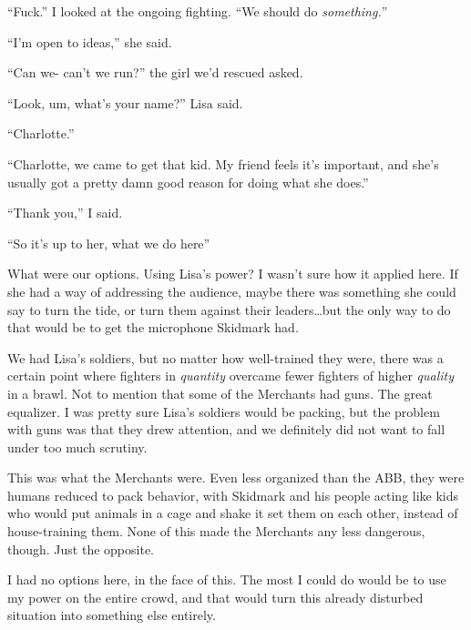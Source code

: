 ``Fuck.'' I looked at the ongoing fighting.  ``We should do \emph{something.}''



``I'm open to ideas,'' she said.



``Can we- can't we run?'' the girl we'd rescued asked.



``Look, um, what's your name?'' Lisa said.



``Charlotte.''



``Charlotte, we came to get that kid.  My friend feels it's important, and she's usually got a pretty damn good reason for doing what she does.''



``Thank you,'' I said.



``So it's up to her, what we do here''



What were our options.  Using Lisa's power?  I wasn't sure how it applied here.  If she had a way of addressing the audience, maybe there was something she could say to turn the tide, or turn them against their leaders\ldots but the only way to do that would be to get the microphone Skidmark had.



We had Lisa's soldiers, but no matter how well-trained they were, there was a certain point where fighters in \emph{quantity} overcame fewer fighters of higher \emph{quality} in a brawl.  Not to mention that some of the Merchants had guns.  The great equalizer.  I was pretty sure Lisa's soldiers would be packing, but the problem with guns was that they drew attention, and we definitely did not want to fall under too much scrutiny.



This was what the Merchants were.  Even less organized than the ABB, they were humans reduced to pack behavior, with Skidmark and his people acting like kids who would put animals in a cage and shake it set them on each other, instead of house-training them.  None of this made the Merchants any less dangerous, though.  Just the opposite.



I had no options here, in the face of this.  The most I could do would be to use my power on the entire crowd, and that would turn this already disturbed situation into something else entirely.




